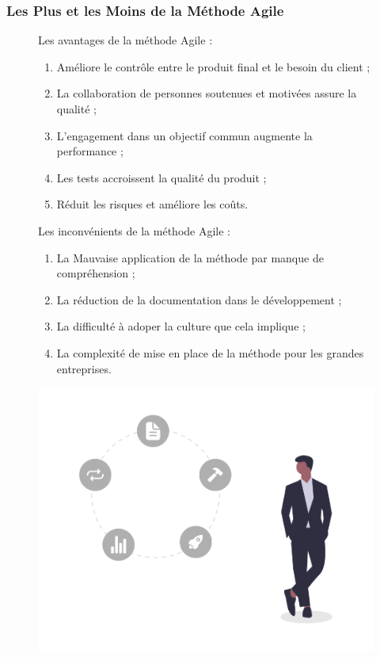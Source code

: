 \documentclass[9pt]{beamer}
\begin{document}
\begin{frame}
	\frametitle{Les Plus et les Moins de la Méthode Agile}
\begin{figure}[!htb]
   \begin{minipage}{0.7\textwidth}
    Les avantages de la méthode Agile :

     \begin{enumerate}
  		\item Améliore le contrôle entre le produit final et le besoin du client ;
		\item  La collaboration de personnes soutenues et motivées assure la qualité ;
		\item  L’engagement dans un objectif commun augmente la performance ;
		\item  Les tests accroissent la qualité du produit ;
		\item  Réduit les risques et améliore les coûts.
	 \end{enumerate}	
	Les inconvénients de la méthode Agile :
     \begin{enumerate}
  		\item  La Mauvaise application de la méthode par manque de compréhension ;
		\item  La réduction de la documentation dans le développement ;
		\item  La difficulté à adoper la culture que cela implique ;
		\item  La complexité de mise en place de la méthode pour les grandes entreprises.

	 \end{enumerate}		 	 
   \end{minipage}\hfill
   \begin{minipage}{0.3\textwidth}
     \centering
     \includegraphics[width=1\linewidth]{../media/Product_iteration}
     \label{Fig:product_iteration}
   \end{minipage}
\end{figure}
\end{frame}
\end{document}
